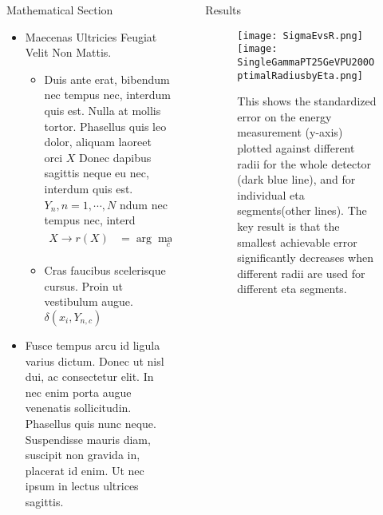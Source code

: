 \documentclass[final,hyperref={pdfpagelabels=false}]{beamer}
\begin{document}
\begin{frame}[t]
\begin{columns}[t]
\begin{column}{.465\textwidth}
\begin{block}{Mathematical Section}
\begin{itemize}
\item Maecenas Ultricies Feugiat Velit Non Mattis.
\begin{itemize}
\item Duis ante erat, bibendum nec tempus nec, interdum quis est. Nulla at mollis tortor. Phasellus quis leo dolor, aliquam laoreet orci $X$ Donec dapibus sagittis neque eu nec, interdum quis est. $Y_n, n=1,\cdots,N$ ndum nec tempus nec, interd
\begin{align*}
X \rightarrow r(X) & = \arg \max_{c} \Big\{ \max_n \big\{ \sum_{x_i \in X} \delta(x_i,Y_{n,c})\big\} \Big\} 
\end{align*}
\item Cras faucibus scelerisque cursus. Proin ut vestibulum augue. $\delta(x_i,Y_{n,c})$
\end{itemize}
\item Fusce tempus arcu id ligula varius dictum. Donec ut nisl dui, ac consectetur elit. In nec enim porta augue venenatis sollicitudin. Phasellus quis nunc neque. Suspendisse mauris diam, suscipit non gravida in, placerat id enim. Ut nec ipsum in lectus ultrices sagittis.
\end{itemize}

\end{block}


\end{column} %

\begin{column}{.03\textwidth}\end{column} %
 
\begin{column}{.465\textwidth} %


\begin{block}{Results}

	

	\begin{figure}
		\texttt{[image: SigmaEvsR.png]}
		\texttt{[image: SingleGammaPT25GeVPU200OptimalRadiusbyEta.png]}
			\caption{This shows the standardized error on the energy measurement (y-axis) plotted against different radii for the whole detector (dark blue line), and for individual eta segments(other lines). The key result is that the smallest achievable error significantly decreases when different radii are used for different eta segments.}
	\end{figure}


\end{block}
\end{column}
\end{columns}
\end{frame}
\end{document}
